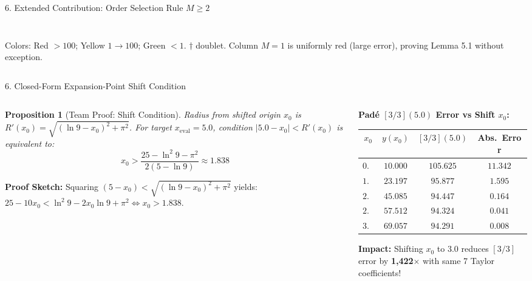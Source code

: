 \documentclass[aspectratio=169]{beamer}
\newtheorem{proposition}[theorem]{Proposition}
\begin{document}
\begin{frame}{6. Extended Contribution: Order Selection Rule $M \geq 2$}
\begin{columns}[T]
\begin{column}{0.48\textwidth}
\begin{tabular}{c|ccccccc}
        \bottomrule
      \end{tabular}
      \vskip2pt
      \raggedright
      \tiny
      Colors: \colorbox{badcell}{Red} $>100$; \colorbox{warncell}{Yellow} $1 \to 100$; \colorbox{goodcell}{Green} $<1$. $\dagger$ doublet.
      \vskip2pt
      \scriptsize
      Column $M=1$ is uniformly red (large error), proving Lemma 5.1 without exception.
    \end{column}
  \end{columns}
  \vskip4pt
\end{frame}

\begin{frame}{6. Closed-Form Expansion-Point Shift Condition}
  \small
  \begin{columns}[T]
    \begin{column}{0.50\textwidth}
      \begin{proposition}[Team Proof: Shift Condition]
        \footnotemark[1]Radius from shifted origin $x_0$ is $R'(x_0) = \sqrt{(\ln 9 - x_0)^2 + \pi^2}$.
        For target $x_{\mathrm{eval}} = 5.0$, condition $|5.0 - x_0| < R'(x_0)$ is equivalent to:
        $$\boxed{x_0 > \frac{25 - \ln^2 9 - \pi^2}{2(5 - \ln 9)} \approx 1.838}$$
      \end{proposition}
      \textbf{Proof Sketch:}
      Squaring $(5 - x_0) < \sqrt{(\ln 9 - x_0)^2 + \pi^2}$ yields:
      $25 - 10x_0 < \ln^2 9 - 2x_0\ln 9 + \pi^2 \iff x_0 > 1.838$.
    \end{column}
    \begin{column}{0.46\textwidth}
      \textbf{Padé $[3/3](5.0)$ Error vs Shift $x_0$:}
      \centering
      \vskip2pt
      \scriptsize
      \setlength{\tabcolsep}{4pt}
      \begin{tabular}{cccc}
        \toprule
        $x_0$ & $y(x_0)$ & $[3/3](5.0)$ & Abs.\ Error \\
        \midrule
        $0.0$ & $10.000$ & $105.625$ & $11.342$ \\
        $1.0$ & $23.197$ & $95.877$  & $1.595$ \\
        \rowcolor{goodcell!50}
        $2.0$ & $45.085$ & $94.447$  & $0.164$ \\
        \rowcolor{goodcell!50}
        $2.5$ & $57.512$ & $94.324$  & $0.041$ \\
        \rowcolor{goodcell!50}
        $3.0$ & $69.057$ & $94.291$  & $0.008$ \\
        \bottomrule
      \end{tabular}
      \vskip2pt
      \raggedright
      \scriptsize
      \textbf{Impact:} Shifting $x_0$ to $3.0$ reduces $[3/3]$ error by \textbf{1,422$\times$} with same 7 Taylor coefficients!
    \end{column}
  \end{columns}
  \vskip4pt
\end{frame}
\end{document}
